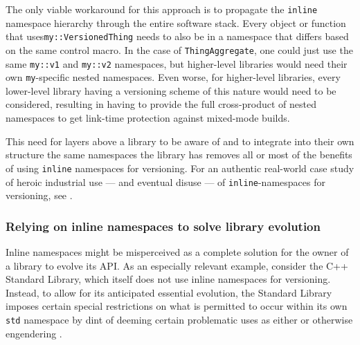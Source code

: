 The only viable workaround for this approach is to propagate the
\lstinline!inline! namespace hierarchy through the entire software stack.
Every object or function that uses\linebreak[4] \lstinline!my::VersionedThing! needs to
also be in a namespace that differs based on the same control macro. In
the case of \lstinline!ThingAggregate!, one could just use the same
\lstinline!my::v1! and \lstinline!my::v2! namespaces, but higher-level
libraries would need their own \lstinline!my!-specific nested namespaces.
Even worse, for higher-level libraries, every lower-level library having
a versioning scheme of this nature would need to be considered,
resulting in having to provide the full cross-product of nested
namespaces to get link-time protection against mixed-mode builds.

This need for layers above a library to be aware of and to integrate
into their own structure the same namespaces the library has removes all
or most of the benefits of using \lstinline!inline! namespaces for
versioning. For an authentic real-world case study of heroic industrial use --- and
eventual disuse --- of \lstinline!inline!-namespaces for versioning, see .

\subsubsection[Relying on \lstinline!inline! namespaces to solve library evolution]{Relying on {\SubsubsecCode inline} namespaces to solve library evolution}\label{specializing-templates-in-std-can-be-problematic}


Inline namespaces might be misperceived as a complete solution for the owner of a library to evolve its API. As an especially relevant example, consider the C++ Standard Library, which itself does not use inline namespaces for versioning. Instead, to allow for its anticipated essential evolution, the Standard Library imposes certain special restrictions on what is permitted to occur within its own \lstinline!std! namespace by dint of deeming certain problematic uses as either  or otherwise engendering .

